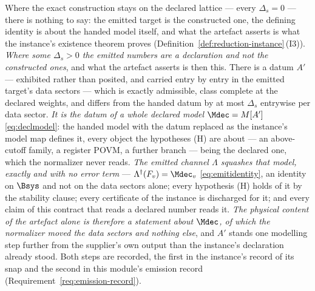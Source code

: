 
\begin{remark}
\label{rem:emitclaim}
Where the exact construction stays on the declared lattice --- every
$\Delta_s=0$ --- there is nothing to say: the emitted target is the
constructed one, the defining identity is about the handed model itself, and
what the artefact asserts is what the instance's existence theorem proves
(Definition~\ref{def:reduction-instance}\,(I3)). \emph{Where some
$\Delta_s>0$ the emitted numbers are a declaration and not the constructed
ones}, and what the artefact asserts is then this. There is a datum $A'$ ---
exhibited rather than posited, and carried entry by entry in the emitted
target's data sectors --- which is exactly admissible, class complete at the
declared weights, and differs from the handed datum by at most $\Delta_s$
entrywise per data sector. \emph{It is the datum of a whole declared model}
$\Mdec=M[A']$ \eqref{eq:declmodel}: the handed model with the datum replaced
as the instance's model map defines it, every object the hypotheses (H) are
about --- an above-cutoff family, a register POVM, a further branch --- being
the declared one, which the normalizer never reads. \emph{The emitted channel
$\Lambda$ squashes that model, exactly and with no error term} ---
$\Lambda^{\dagger}(F_v)=\Mdec_v$ \eqref{eq:emitidentity}, an identity on
$\Bsys$ and not on the data sectors alone; every hypothesis (H) holds of it by
the stability clause; every certificate of the instance is discharged for it;
and every claim of this contract that reads a declared number reads it.
\emph{The physical content of the artefact alone is therefore a statement
about $\Mdec$, of which the normalizer moved the data sectors and nothing
else}, and $A'$ stands one modelling step further from the supplier's own
output than the instance's declaration already stood. Both steps are
recorded, the first in the instance's record of its snap and the second in
this module's emission record (Requirement~\ref{req:emission-record}).


\end{remark}
